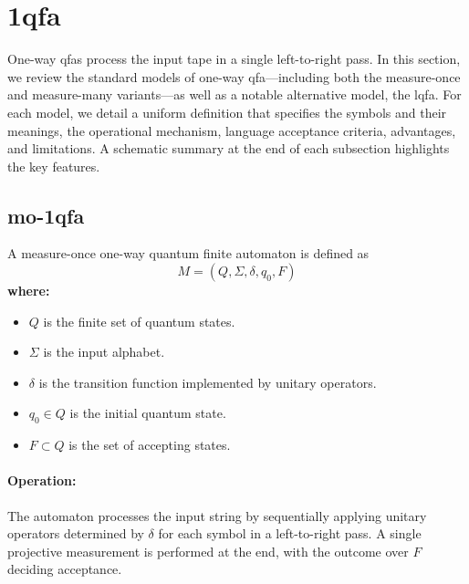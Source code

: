\section{\gls{1qfa}}
\label{sec:one-way-qfas}

One-way \glspl{qfa} process the input tape in a single left-to-right pass. In this section, we review the standard models of one-way \gls{qfa}—including both the measure-once and measure-many variants—as well as a notable alternative model, the \gls{lqfa}. For each model, we detail a uniform definition that specifies the symbols and their meanings, the operational mechanism, language acceptance criteria, advantages, and limitations. A schematic summary at the end of each subsection highlights the key features.



\subsection{\acrfull{mo-1qfa}}
\label{subsec:mo-1qfa}
\begin{definition}
A measure-once one-way quantum finite automaton is defined as 
\[
M = (Q, \Sigma, \delta, q_0, F)
\]
\textbf{where:}
\begin{itemize}
    \item \( Q \) is the finite set of quantum states.
    \item \( \Sigma \) is the input alphabet.
    \item \( \delta \) is the transition function implemented by unitary operators.
    \item \( q_0 \in Q \) is the initial quantum state.
    \item \( F \subset Q \) is the set of accepting states.
\end{itemize}
\end{definition}

\paragraph{Operation:}  
The automaton processes the input string by sequentially applying unitary operators determined by \( \delta \) for each symbol in a left-to-right pass. A single projective measurement is performed at the end, with the outcome over \( F \) deciding acceptance.

